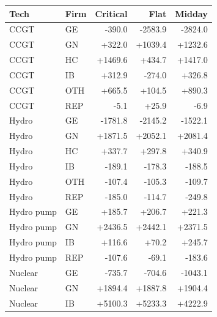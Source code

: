 \begin{tabular}{l l r r r}
\toprule
Tech & Firm & Critical & Flat & Midday \\
\midrule
CCGT & GE & -390.0 & -2583.9 & -2824.0 \\
CCGT & GN & +322.0 & +1039.4 & +1232.6 \\
CCGT & HC & +1469.6 & +434.7 & +1417.0 \\
CCGT & IB & +312.9 & -274.0 & +326.8 \\
CCGT & OTH & +665.5 & +104.5 & +890.3 \\
CCGT & REP & -5.1 & +25.9 & -6.9 \\
Hydro & GE & -1781.8 & -2145.2 & -1522.1 \\
Hydro & GN & +1871.5 & +2052.1 & +2081.4 \\
Hydro & HC & +337.7 & +297.8 & +340.9 \\
Hydro & IB & -189.1 & -178.3 & -188.5 \\
Hydro & OTH & -107.4 & -105.3 & -109.7 \\
Hydro & REP & -185.0 & -114.7 & -249.8 \\
Hydro pump & GE & +185.7 & +206.7 & +221.3 \\
Hydro pump & GN & +2436.5 & +2442.1 & +2371.5 \\
Hydro pump & IB & +116.6 & +70.2 & +245.7 \\
Hydro pump & REP & -107.6 & -69.1 & -183.6 \\
Nuclear & GE & -735.7 & -704.6 & -1043.1 \\
Nuclear & GN & +1894.4 & +1887.8 & +1904.4 \\
Nuclear & IB & +5100.3 & +5233.3 & +4222.9 \\
\bottomrule
\end{tabular}